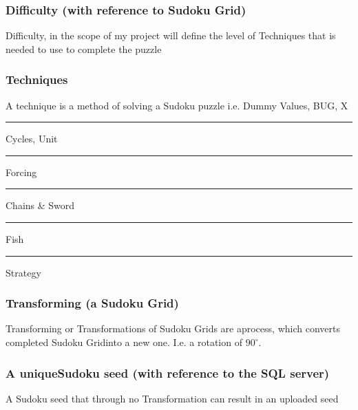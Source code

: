 \documentclass[fleqn]{article}
\newcommand{\TextUnderscore}{\rule{.4em}{.4pt}}
\begin{document}
\subsubsection*{Difficulty (with reference to Sudoku Grid)}
Difficulty, in the scope of my project will define the level of Techniques that is needed to use to complete the puzzle 
\subsubsection*{Techniques}
A technique is a method of solving a Sudoku puzzle i.e. Dummy Values, BUG, X\TextUnderscore Cycles, Unit\TextUnderscore Forcing\TextUnderscore Chains \& Sword\TextUnderscore Fish\TextUnderscore Strategy
\subsubsection*{Transforming (a Sudoku Grid)}
Transforming or Transformations of Sudoku Grids are aprocess, which converts completed Sudoku Gridinto a new one. I.e. a rotation of $90^\circ$.
\subsubsection*{A uniqueSudoku seed (with reference to the SQL server)}
A Sudoku seed that through no Transformation can result in an uploaded seed
\end{document}
